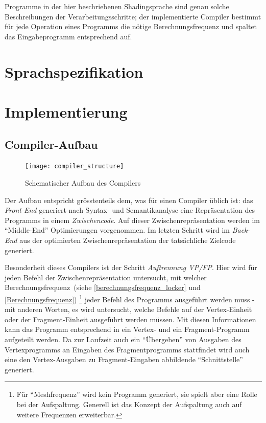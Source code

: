 \documentclass[twoside,a4paper,fleqn,12pt]{article}
\begin{document}
Programme in der hier beschriebenen Shadingsprache sind genau solche Beschreibungen der Verarbeitungsschritte; der implementierte Compiler
bestimmt für jede Operation eines Programms die nötige Berechnungsfrequenz und spaltet das Eingabeprogramm entsprechend auf.

\section{Sprachspezifikation}
\label{langspec}



\section{Implementierung}
\label{implementation}

\subsection{Compiler-Aufbau}
\begin{figure}[h]
   \centering
  \texttt{[image: compiler\_structure]}
  \caption{Schematischer Aufbau des Compilers}
  \label{fig:structure}
\end{figure}

Der Aufbau entspricht grösstenteils dem, was für einen Compiler üblich ist: das \emph{Front-End} generiert nach Syntax- und Semantikanalyse
eine Repräsentation des Programms in einem \emph{Zwischencode}. Auf dieser Zwischenrepräsentation werden im "`Middle-End"' %
Optimierungen vorgenommen. Im letzten Schritt wird im \emph{Back-End} aus der optimierten Zwischenrepräsentation der tatsächliche Zielcode generiert.

Besonderheit dieses Compilers ist der Schritt \emph{Auftrennung VP/FP}. Hier wird für jeden Befehl der Zwischenrepräsentation untersucht, mit
welcher Berechnungsfrequenz~(siehe \ref{berechnungsfrequenz_locker} und \ref{Berechnungsfrequenz})
\footnote{Für "`Meshfrequenz"' wird kein Programm generiert, sie spielt aber eine Rolle bei der Aufspaltung. Generell ist das Konzept der Aufspaltung auch auf weitere Frequenzen erweiterbar.}
jeder Befehl des Programms ausgeführt werden muss - mit anderen Worten,
es wird untersucht, welche Befehle auf der Vertex-Einheit oder der Fragment-Einheit ausgeführt werden müssen. Mit diesen Informationen kann
das Programm entsprechend in ein Vertex- und ein Fragment-Programm aufgeteilt werden. Da zur Laufzeit auch ein "`Übergeben"' von Ausgaben
des Vertexprogramms an Eingaben des Fragmentprogramms stattfindet wird auch eine den Vertex-Ausgaben zu Fragment-Eingaben
abbildende "`Schnittstelle"' generiert.
\end{document}
